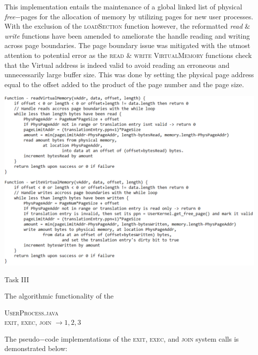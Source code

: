 \documentclass[12pt]{article}
\begin{document}
{This implementation entails the maintenance of a global linked list of physical \textit{free}$-$pages for the allocation of memory by 
utilizing pages for new user processes. With the exclusion of the \textsc{loadSection} function however, the reformatted \textit{read} $\&$ \textit{write} functions have been amended
to ameliorate the handle reading and writing across page boundaries. The page boundary issue was mitigated with the utmost attention to potential error as the \textsc{read} $\&$ \textsc{write} \textsc{VirtualMemory} functions check that the Virtual address is indeed valid to avoid reading an erroneous and unnecessarily large buffer size.
This was done by setting the physical page address equal to the offset added to the product of the page number and the page size. 
\begin{center}\includegraphics[width=150mm]{pic2_1.png}\end{center}
\begin{center}Task III\end{center}
The algorithmic functionality of the 
\begin{center}
\textsc{UserProcess.java} \\
\textsc{exit}, \textsc{exec}, \textsc{join} $\longrightarrow 1, 2, 3$ \\
\end{center}
The pseudo$-$code implementations of the \textsc{exit}, \textsc{exec}, and \textsc{join} system calls is demonstrated below:
}
\end{document}
